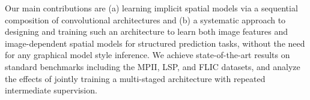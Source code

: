 \documentclass[10pt,twocolumn,letterpaper]{article}
\begin{document}
Our main contributions are (a) learning implicit spatial models via a sequential composition of convolutional architectures and (b) a systematic approach to designing and training such an architecture  to learn both image features and image-dependent spatial models for structured prediction tasks, without the need for any graphical model style inference. We achieve state-of-the-art results on standard benchmarks including the MPII, LSP, and FLIC datasets, and analyze the effects of jointly training a multi-staged architecture with repeated intermediate supervision.

\end{document}
